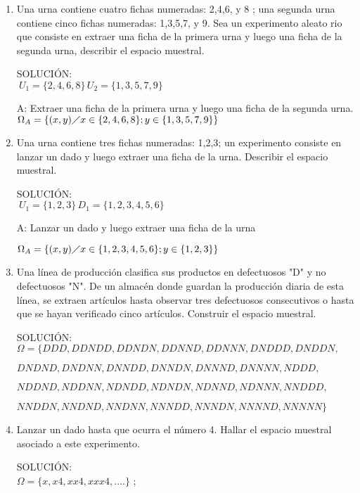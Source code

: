 \documentclass[13pt,a4paper]{article}
\begin{document}
\begin{enumerate}
 \item Una urna contiene cuatro fichas numeradas: 2,4,6, y 8 ; una segunda urna
contiene cinco fichas numeradas: 1,3,5,7, y 9. Sea un experimento aleato
rio que consiste en extraer una ficha de la primera urna y luego una ficha de la segunda urna, describir el espacio muestral.

SOLUCIÓN:\\[0.2cm]
$\ U_{1}=\lbrace2,4,6,8\rbrace \, U_{2}=\lbrace1,3,5,7,9\rbrace$

A: Extraer una ficha de la primera urna  y luego una ficha de la segunda urna.\\[0.2cm]
$\Omega_{A}=\lbrace (x,y)\diagup x \in \lbrace2,4,6,8\rbrace ; y \in \lbrace1,3,5,7,9\rbrace\rbrace$

\item Una urna contiene tres fichas numeradas: 1,2,3; un experimento consiste
en lanzar un dado y luego extraer una ficha de la urna. Describir el espacio muestral.

SOLUCIÓN:\\[0.2cm]
$\ U_{1}=\lbrace1,2,3\rbrace       \,   D_{1}=\lbrace1,2,3,4,5,6\rbrace$

A: Lanzar un dado y luego extraer una ficha de la urna 

$\Omega_{A}=\lbrace (x,y) \diagup x \in \lbrace1,2,3,4,5,6\rbrace ;  y \in \lbrace1,2,3\rbrace \rbrace$


\item Una línea de producción clasifica sus productos en defectuosos "D" y no
defectuosos "N". De un almacén donde guardan la producción diaria de esta
línea, se extraen artículos hasta observar tres defectuosos consecutivos
o hasta que se hayan verificado cinco artículos. Construir el espacio 
muestral.

SOLUCIÓN:\\[0.2cm]
$\Omega=\lbrace DDD,DDNDD,DDNDN,DDNND,DDNNN,DNDDD,DNDDN,$

$ DNDND,DNDNN,DNNDD,DNNDN,DNNND,DNNNN,NDDD,$

$ NDDND,NDDNN,NDNDD,NDNDN,NDNND,NDNNN,NNDDD,$

$ NNDDN,NNDND,NNDNN,NNNDD,NNNDN,NNNND,NNNNN\rbrace$

\item Lanzar un dado hasta que ocurra el número 4. Hallar el espacio muestral
asociado a este experimento.

SOLUCIÓN:\\[0.2cm]
$\Omega=\lbrace x,x4,xx4,xxx4, ....\rbrace$ ;


\end{enumerate}
\end{document}
